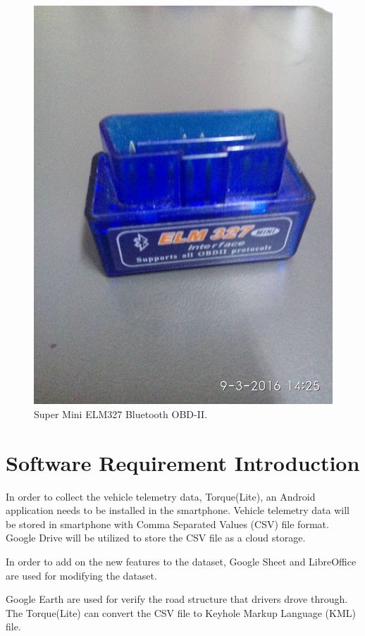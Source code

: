 \begin{figure}[hbt!]\centering
\includegraphics[height=.5\textheight]{image/ELM327}
\caption{Super Mini ELM327 Bluetooth OBD-II.}
\end{figure}

\section{Software Requirement Introduction}
In order to collect the vehicle telemetry data, Torque(Lite), an Android application needs to be installed in the smartphone. Vehicle telemetry data will be stored in smartphone with Comma Separated Values (CSV) file format. Google Drive will be utilized to store the CSV file as a cloud storage.

In order to add on the new features to the dataset, Google Sheet and LibreOffice are used for modifying the dataset. 

Google Earth are used for verify the road structure that drivers drove through. The Torque(Lite) can convert the CSV file to Keyhole Markup Language (KML) file.
 
